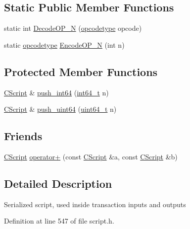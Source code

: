 \subsection*{Static Public Member Functions}
\begin{DoxyCompactItemize}
\item 
static int \hyperlink{class_c_script_a7f975fca06b3e9a17da8ba23c7647e2e}{Decode\+O\+P\+\_\+\+N} (\hyperlink{script_8h_a63e349a6089a54da9fe09a3d858648bd}{opcodetype} opcode)
\item 
static \hyperlink{script_8h_a63e349a6089a54da9fe09a3d858648bd}{opcodetype} \hyperlink{class_c_script_ae81b29e2e86343bedacfd4e0ef87bca6}{Encode\+O\+P\+\_\+\+N} (int n)
\end{DoxyCompactItemize}
\subsection*{Protected Member Functions}
\begin{DoxyCompactItemize}
\item 
\hyperlink{class_c_script}{C\+Script} \& \hyperlink{class_c_script_ad802105f1515b4953ecbe6aeab2ee1ca}{push\+\_\+int64} (\hyperlink{stdint_8h_adec1df1b8b51cb32b77e5b86fff46471}{int64\+\_\+t} n)
\item 
\hyperlink{class_c_script}{C\+Script} \& \hyperlink{class_c_script_adeadab761c1952847ba0d1b0b1011e16}{push\+\_\+uint64} (\hyperlink{stdint_8h_aaa5d1cd013383c889537491c3cfd9aad}{uint64\+\_\+t} n)
\end{DoxyCompactItemize}
\subsection*{Friends}
\begin{DoxyCompactItemize}
\item 
\hyperlink{class_c_script}{C\+Script} \hyperlink{class_c_script_a533d7ad1fc14f689b3aec7d7af7800ee}{operator+} (const \hyperlink{class_c_script}{C\+Script} \&a, const \hyperlink{class_c_script}{C\+Script} \&b)
\end{DoxyCompactItemize}


\subsection{Detailed Description}
Serialized script, used inside transaction inputs and outputs 

Definition at line 547 of file script.\+h.



